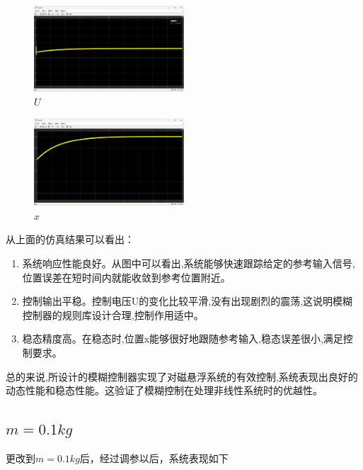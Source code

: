 \documentclass[12pt,a4paper,UTF8]{article}
\begin{document}
\begin{figure}[htbp] \centering \includegraphics[width=0.5\textwidth]{figures/2024-12-13-22-22-07.png} \caption{$U$}  \end{figure}

\begin{figure}[htbp] \centering \includegraphics[width=0.5\textwidth]{figures/2024-12-13-22-22-41.png} \caption{$x$}  \end{figure}

从上面的仿真结果可以看出：

\begin{enumerate}
\item 系统响应性能良好。从图中可以看出,系统能够快速跟踪给定的参考输入信号,位置误差在短时间内就能收敛到参考位置附近。

\item 控制输出平稳。控制电压U的变化比较平滑,没有出现剧烈的震荡,这说明模糊控制器的规则库设计合理,控制作用适中。

\item 稳态精度高。在稳态时,位置x能够很好地跟随参考输入,稳态误差很小,满足控制要求。
\end{enumerate}

总的来说,所设计的模糊控制器实现了对磁悬浮系统的有效控制,系统表现出良好的动态性能和稳态性能。这验证了模糊控制在处理非线性系统时的优越性。


\subsection{$m = 0.1kg$}
更改到$m=0.1kg$后，经过调参以后，系统表现如下
\end{document}
